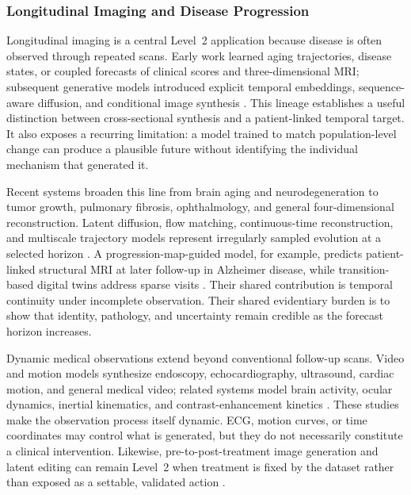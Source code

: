 \subsubsection{Longitudinal Imaging and Disease Progression}

Longitudinal imaging is a central Level~2 application because disease is often observed through repeated scans. Early work learned aging trajectories, disease states, or coupled forecasts of clinical scores and three-dimensional MRI; subsequent generative models introduced explicit temporal embeddings, sequence-aware diffusion, and conditional image synthesis \citep{Xia2021Learningsynthesiseageing,Severson2021DiscoveryParkinsons,Zhao2022Multiviewprediction,Sch_n2023ExplicitTemporalEmbedding,Yoon2023SADMSequenceaware,Dao2024ConditionalDiffusionModel}. This lineage establishes a useful distinction between cross-sectional synthesis and a patient-linked temporal target. It also exposes a recurring limitation: a model trained to match population-level change can produce a plausible future without identifying the individual mechanism that generated it.

Recent systems broaden this line from brain aging and neurodegeneration to tumor growth, pulmonary fibrosis, ophthalmology, and general four-dimensional reconstruction. Latent diffusion, flow matching, continuous-time reconstruction, and multiscale trajectory models represent irregularly sampled evolution at a selected horizon \citep{Puglisi2025BrainLatentProgression,Aghaei2025integratedpredictivemodel,Laslo2025MechanisticLearningGuided,Chen2025LearningPatientSpecific,Kapoor2025MrextrapLongitudinalAging,Zhao20254dVqGan,Disch2025CronosContinuousTime,Disch2025TemporalFlowMatching,Liu2025ImageflownetForecastingMultiscale}. A progression-map-guided model, for example, predicts patient-linked structural MRI at later follow-up in Alzheimer disease, while transition-based digital twins address sparse visits \citep{Huang2026TransitionBasedDigital,Zhao2026ForecastingAD}. Their shared contribution is temporal continuity under incomplete observation. Their shared evidentiary burden is to show that identity, pathology, and uncertainty remain credible as the forecast horizon increases.

Dynamic medical observations extend beyond conventional follow-up scans. Video and motion models synthesize endoscopy, echocardiography, ultrasound, cardiac motion, and general medical video; related systems model brain activity, ocular dynamics, inertial kinematics, and contrast-enhancement kinetics \citep{Cao2024MedicalVideoGeneration,Li2024EndoraVideoGeneration,Li2024EchopulseEcgControlled,Yu2024ExplainableControllableMotion,Caro2024BrainlmFoundationModel,Chen2025UltrasoundImageVideo,You2025TemporalDifferentialFields,Gao2026EyeworldGenerativeWorld,Delaney2026SonataHybridWorld,Kong2026MRIContrastEnhancement}. These studies make the observation process itself dynamic. ECG, motion curves, or time coordinates may control what is generated, but they do not necessarily constitute a clinical intervention. Likewise, pre-to-post-treatment image generation and latent editing can remain Level~2 when treatment is fixed by the dataset rather than exposed as a settable, validated action \citep{Yeganeh2025LatentDriftingDiffusion,Leclercq2025PrePostTreatment}.

